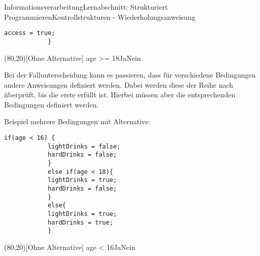 \documentclass[11pt,oneside,openany,headings=optiontotoc,11pt,numbers=noenddot]{article}
\begin{document}
\begin{worksheet}{Informationsverarbeitung}{Lernabschnitt: Strukturiert Programmieren}{Kontrollstrukturen - Wiederholungsanweisung}
\begin{minipage}[t]{0.48\textwidth}
\begin{lstlisting}[style=JavaInputStyle,frame=single]
			access = true;
			}
			\end{lstlisting}
		\end{minipage}
		\hfill
		\begin{minipage}[t]{0.48\textwidth}
			\vspace*{0pt}
			\begin{struktogramm}(80,20)[Ohne Alternative]
				{age >= 18}{Ja}{Nein}
				\change
				\ifend
			\end{struktogramm}
		\end{minipage}
		\par\noindent
		Bei der Fallunterscheidung kann es passieren, dass für verschiedene Bedingungen andere Anweisungen definiert werden. Dabei werden diese der Reihe nach überprüft, bis die erste erfüllt ist. Hierbei müssen aber die entsprechenden Bedingungen definiert werden.
		\par\noindent
		\begin{minipage}[t]{0.48\textwidth}
			\vspace*{0pt}
			Beispiel mehrere Bedingungen mit Alternative:
			\begin{lstlisting}[style=JavaInputStyle,frame=single]
			if(age < 16) {
			lightDrinks = false;
			hardDrinks = false;
			}
			else if(age < 18){
			lightDrinks = true;
			hardDrinks = false;
			}
			else{
			lightDrinks = true;
			hardDrinks = true;
			}
			\end{lstlisting}
		\end{minipage}
		\hfill
		\begin{minipage}[t]{0.48\textwidth}
			\vspace*{0pt}
			\begin{struktogramm}(80,20)[Ohne Alternative]
				{age < 16}{Ja}{Nein}
				\change
				\change
				\ifend
				\ifend
			\end{struktogramm}
		\end{minipage}

\end{worksheet}
\end{document}
